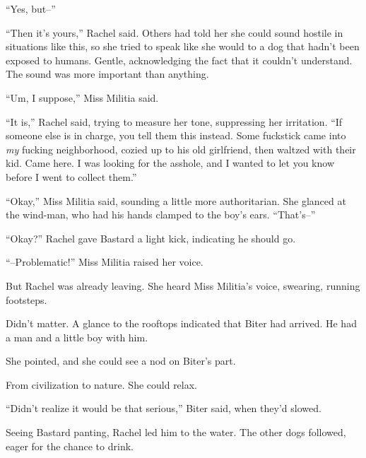 ``Yes, but--''



``Then it's yours,'' Rachel said.  Others had told her she could sound hostile in situations like this, so she tried to speak like she would to a dog that hadn't been exposed to humans.  Gentle, acknowledging the fact that it couldn't understand.  The sound was more important than anything.



``Um, I suppose,'' Miss Militia said.



``It is,'' Rachel said, trying to measure her tone, suppressing her irritation.  ``If someone else is in charge, you tell them this instead.  Some fuckstick came into \emph{my} fucking neighborhood, cozied up to his old girlfriend, then waltzed with their kid.  Came here.  I was looking for the asshole, and I wanted to let you know before I went to collect them.''



``Okay,'' Miss Militia said, sounding a little more authoritarian.  She glanced at the wind-man, who had his hands clamped to the boy's ears.  ``That's--''



``Okay?''  Rachel gave Bastard a light kick, indicating he should go.



``--Problematic!''  Miss Militia raised her voice.



But Rachel was already leaving.  She heard Miss Militia's voice, swearing, running footsteps.



Didn't matter.  A glance to the rooftops indicated that Biter had arrived.  He had a man and a little boy with him.



She pointed, and she could see a nod on Biter's part.



\sectionbreak



From civilization to nature.  She could relax.



``Didn't realize it would be that serious,'' Biter said, when they'd slowed.



Seeing Bastard panting, Rachel led him to the water.  The other dogs followed, eager for the chance to drink.



